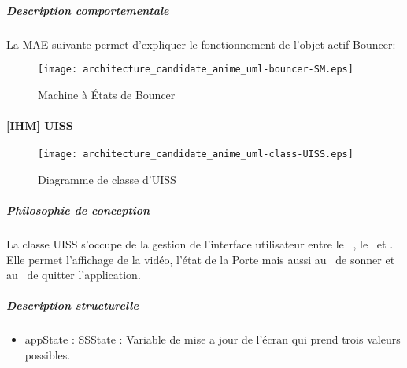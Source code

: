 \newpage
        \subparagraph{Description comportementale}%
        La MAE suivante permet d'expliquer le fonctionnement de l'objet actif Bouncer:
        \begin{figure} [H]
            \centering
            \texttt{[image: architecture\_candidate\_anime\_uml-bouncer-SM.eps]}
            \caption{Machine à États de Bouncer}
            \label{MAE-Bouncer}
        \end{figure}
    
\newpage

    \paragraph{[IHM] UISS}%
    \begin{figure} [H]
        \centering
        \texttt{[image: architecture\_candidate\_anime\_uml-class-UISS.eps]}
        \caption{Diagramme de classe d'UISS}
        \label{Classe-UISS}
    \end{figure}
        \subparagraph{Philosophie de conception}%
        La classe UISS s'occupe de la gestion de l'interface utilisateur entre le \actT~, le \actD~et \appliLin.
        Elle permet l'affichage de la vidéo, l'état de la Porte mais aussi au \actT~de sonner et au \actD~de quitter l'application.
        \subparagraph{Description structurelle}%
            \begin{itemize}
                 \item {appState : SSState : Variable de mise a jour de l'écran qui prend trois valeurs possibles.}
            \end{itemize}
